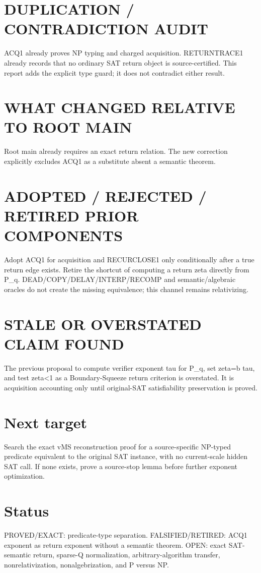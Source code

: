 \documentclass{article}
\begin{document}
\section*{DUPLICATION / CONTRADICTION AUDIT}
ACQ1 already proves NP typing and charged acquisition. RETURNTRACE1 already records that no ordinary SAT return object is source-certified. This report adds the explicit type guard; it does not contradict either result.
\section*{WHAT CHANGED RELATIVE TO ROOT MAIN}
Root main already requires an exact return relation. The new correction explicitly excludes ACQ1 as a substitute absent a semantic theorem.
\section*{ADOPTED / REJECTED / RETIRED PRIOR COMPONENTS}
Adopt ACQ1 for acquisition and RECURCLOSE1 only conditionally after a true return edge exists. Retire the shortcut of computing a return zeta directly from P_q. DEAD/COPY/DELAY/INTERP/RECOMP and semantic/algebraic oracles do not create the missing equivalence; this channel remains relativizing.
\section*{STALE OR OVERSTATED CLAIM FOUND}
The previous proposal to compute verifier exponent tau for P_q, set zeta=b tau, and test zeta<1 as a Boundary-Squeeze return criterion is overstated. It is acquisition accounting only until original-SAT satisfiability preservation is proved.
\section*{Next target}
Search the exact vMS reconstruction proof for a source-specific NP-typed predicate equivalent to the original SAT instance, with no current-scale hidden SAT call. If none exists, prove a source-stop lemma before further exponent optimization.
\section*{Status}
PROVED/EXACT: predicate-type separation. FALSIFIED/RETIRED: ACQ1 exponent as return exponent without a semantic theorem. OPEN: exact SAT-semantic return, sparse-Q normalization, arbitrary-algorithm transfer, nonrelativization, nonalgebrization, and P versus NP.
\end{document}
